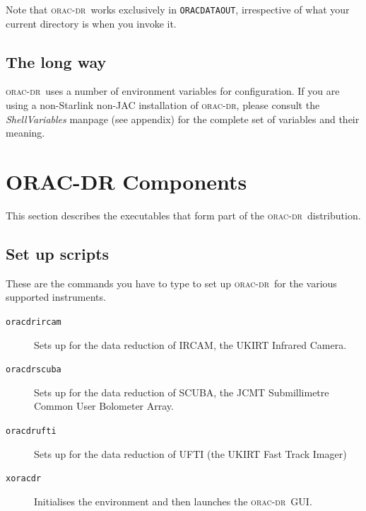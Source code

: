 \documentclass[twoside,11pt]{article}
\renewcommand{\_}{\texttt{\symbol{95}}}
\newcommand{\oracdr}{\textsc{orac-dr}}
\begin{document}
Note that \oracdr\ works exclusively in \texttt{ORAC\_DATA\_OUT}, irrespective of
what your current directory is when you invoke it.

\subsection*{The long way\label{Setting_up_to_run_oracdr_The_long_way}}

\oracdr\ uses a number of environment variables for configuration. If
you are using a non-Starlink non-JAC installation of \oracdr, please
consult the \emph{ShellVariables} manpage (see appendix) for the complete set of
variables and their meaning.


\section{ORAC-DR Components\label{ORAC-DR_Components}}

This section describes the executables that form part of the \oracdr\
distribution.

\subsection*{Set up scripts\label{ORAC-DR_Components_Set_up_scripts}}

These are the commands you have to type to set up \oracdr\ for the various
supported instruments.

\begin{description}
\item[\texttt{oracdr\_ircam}] \mbox{}

Sets up for the data reduction of IRCAM, the UKIRT Infrared Camera.

\item[\texttt{oracdr\_scuba}] \mbox{}

Sets up for the data reduction of SCUBA, the JCMT Submillimetre Common
User Bolometer Array.

\item[\texttt{oracdr\_ufti}] \mbox{}

Sets up for the data reduction of UFTI (the UKIRT Fast Track Imager)

\item[\texttt{xoracdr}] \mbox{}

Initialises the environment and then launches the \oracdr\ GUI.

\end{description}
\end{document}
